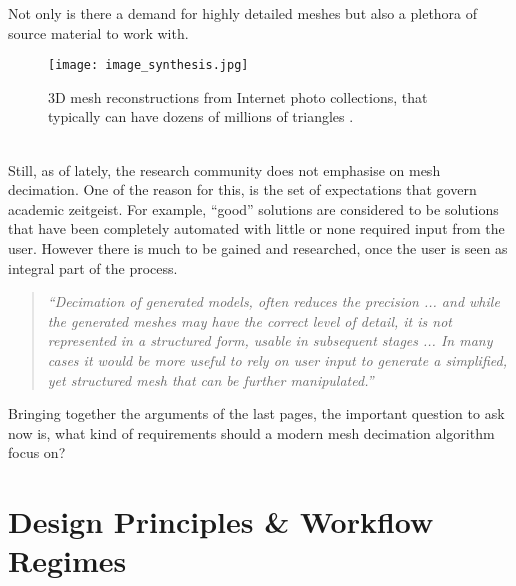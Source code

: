 Not only is there a demand for highly detailed meshes but also a plethora of source material to work with.
\begin{figure}[ht]
\centering
\texttt{[image: image\_synthesis.jpg]}
\caption{3D mesh reconstructions from Internet photo collections, that typically can have dozens of millions of triangles \citep[][p.6]{Snavely2008}.}
\label{fig:image_synthesis}
\end{figure}\\
Still, as of lately, the research community does not emphasise on mesh decimation.
One of the reason for this, is the set of expectations that govern academic zeitgeist.
For example, ``good'' solutions are considered to be solutions that have been completely automated with little or none required input from the user.
However there is much to be gained and researched, once the user is seen as integral part of the process.
\begin{quote} \textit{``Decimation of generated models, often reduces the precision ... and while the generated meshes may have the correct level of detail, it is not represented in a structured form, usable in subsequent stages ... In many cases it would be more useful to rely on user input to generate a simplified, yet structured mesh that can be further manipulated.''} \citep[p.195]{Sylwan2011} \end{quote}
Bringing together the arguments of the last pages, the important question to ask now is, what kind of requirements should a modern mesh decimation algorithm focus on?

\section{Design Principles \& Workflow Regimes}
\label{introduction4}

